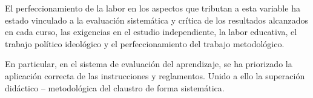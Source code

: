 El perfeccionamiento de la labor en los aspectos que tributan a esta variable ha estado vinculado a la evaluación sistemática y crítica de los resultados alcanzados en cada curso, las exigencias en el estudio independiente, la labor educativa, el trabajo político ideológico y el perfeccionamiento del trabajo metodológico.

En particular, en el sistema de evaluación del aprendizaje, se ha priorizado la aplicación correcta de las instrucciones y reglamentos. Unido a ello la superación didáctico – metodológica del claustro de forma sistemática.
